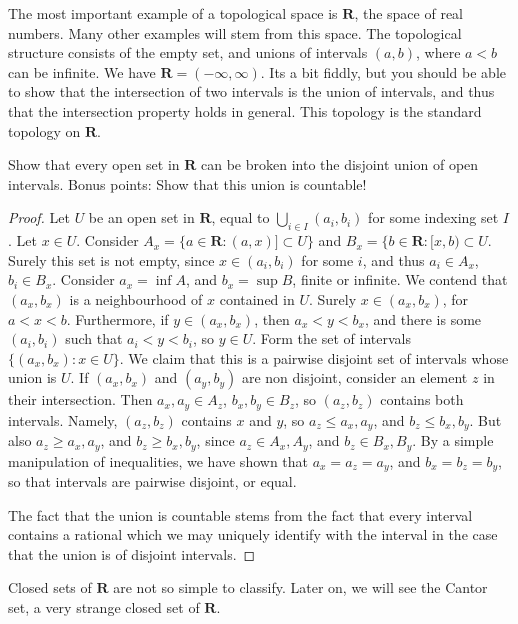 The most important example of a topological space is $\mathbf{R}$, the space of real numbers. Many other examples will stem from this space. The topological structure consists of the empty set, and unions of intervals $(a,b)$, where $a < b$ can be infinite. We have $\mathbf{R} = (-\infty, \infty)$. Its a bit fiddly, but you should be able to show that the intersection of two intervals is the union of intervals, and thus that the intersection property holds in general. This topology is the standard topology on $\mathbf{R}$.

\begin{exercise}
    Show that every open set in $\mathbf{R}$ can be broken into the disjoint union of open intervals. Bonus points: Show that this union is countable!
\end{exercise}
\begin{proof}
    Let $U$ be an open set in $\mathbf{R}$, equal to $\bigcup_{i \in I} (a_i, b_i)$ for some indexing set $I$. Let $x \in U$. Consider $A_x = \{ a \in \mathbf{R} : (a,x)] \subset U \}$ and $B_x = \{ b \in \mathbf{R} : [x,b) \subset U$. Surely this set is not empty, since $x \in (a_i, b_i)$ for some $i$, and thus $a_i \in A_x$, $b_i \in B_x$. Consider $a_x = \inf A$, and $b_x = \sup B$, finite or infinite. We contend that $(a_x,b_x)$ is a neighbourhood of $x$ contained in $U$. Surely $x \in (a_x,b_x)$, for $a < x < b$. Furthermore, if $y \in (a_x,b_x)$, then $a_x < y < b_x$, and there is some $(a_i, b_i)$ such that $a_i < y < b_i$, so $y \in U$. Form the set of intervals $\{ (a_x, b_x): x \in U\}$. We claim that this is a pairwise disjoint set of intervals whose union is $U$. If $(a_x, b_x)$ and $(a_y, b_y)$ are non disjoint, consider an element $z$ in their intersection. Then $a_x, a_y \in A_z$, $b_x, b_y \in B_z$, so $(a_z, b_z)$ contains both intervals. Namely, $(a_z, b_z)$ contains $x$ and $y$, so $a_z \leq a_x, a_y$, and $b_z \leq b_x, b_y$. But also $a_z \geq a_x, a_y$, and $b_z \geq b_x, b_y$, since $a_z \in A_x, A_y$, and $b_z \in B_x, B_y$. By a simple manipulation of inequalities, we have shown that $a_x = a_z = a_y$, and $b_x = b_z = b_y$, so that intervals are pairwise disjoint, or equal.

    The fact that the union is countable stems from the fact that every interval contains a rational which we may uniquely identify with the interval in the case that the union is of disjoint intervals.
\end{proof}

Closed sets of $\mathbf{R}$ are not so simple to classify. Later on, we will see the Cantor set, a very strange closed set of $\mathbf{R}$.

